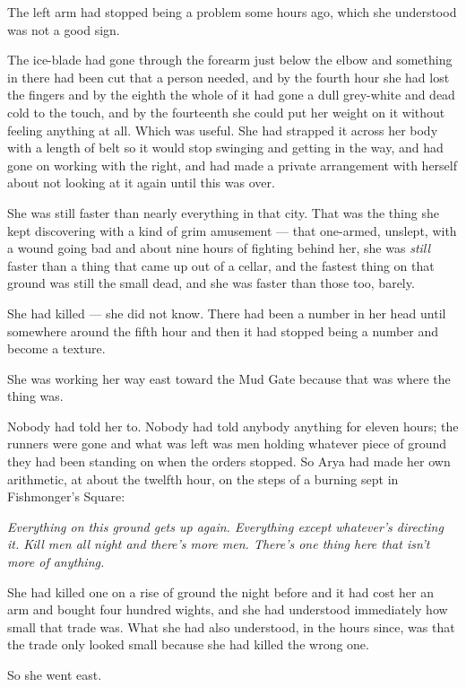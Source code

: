 The left arm had stopped being a problem some hours ago, which she understood was not a good sign.

The ice-blade had gone through the forearm just below the elbow and something in there had been cut that a person needed, and by the fourth hour she had lost the fingers and by the eighth the whole of it had gone a dull grey-white and dead cold to the touch, and by the fourteenth she could put her weight on it without feeling anything at all. Which was useful. She had strapped it across her body with a length of belt so it would stop swinging and getting in the way, and had gone on working with the right, and had made a private arrangement with herself about not looking at it again until this was over.

She was still faster than nearly everything in that city. That was the thing she kept discovering with a kind of grim amusement — that one-armed, unslept, with a wound going bad and about nine hours of fighting behind her, she was \textit{still} faster than a thing that came up out of a cellar, and the fastest thing on that ground was still the small dead, and she was faster than those too, barely.

She had killed — she did not know. There had been a number in her head until somewhere around the fifth hour and then it had stopped being a number and become a texture.

\sceneBreak

She was working her way east toward the Mud Gate because that was where the thing was.

Nobody had told her to. Nobody had told anybody anything for eleven hours; the runners were gone and what was left was men holding whatever piece of ground they had been standing on when the orders stopped. So Arya had made her own arithmetic, at about the twelfth hour, on the steps of a burning sept in Fishmonger’s Square:

\textit{Everything on this ground gets up again. Everything except whatever’s directing it. Kill men all night and there’s more men. There’s one thing here that isn’t more of anything.}

She had killed one on a rise of ground the night before and it had cost her an arm and bought four hundred wights, and she had understood immediately how small that trade was. What she had also understood, in the hours since, was that the trade only looked small because she had killed the wrong one.

So she went east.

